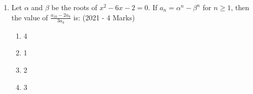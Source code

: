 \documentclass[journal]{IEEEtran}
\begin{document}
\begin{enumerate}
{		}
    \item{
        
            Let $\alpha$ and $\beta$ be the roots of $x^2 - 6x - 2 = 0$. If $a_n = \alpha^n - \beta^n$ for $n \geq 1$, then the value of $\frac{a_{10} - 2a_8}{3a_9}$ is:
             \hfill
              {(2021 - 4 Marks)}
              \begin{multicols}{4}
	              	\begin{enumerate}
	              		\item 4
	              		\item 1
	              		\item 2
	              		\item 3
	              	\end{enumerate}
              \end{multicols}
        
        }
    \end{enumerate}
\end{document}
